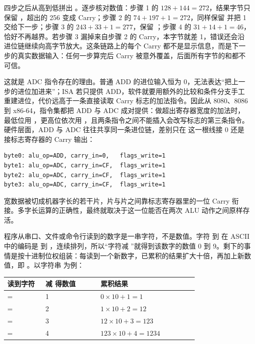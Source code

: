 四步之后从高到低拼出 。逐步核对数值：步骤 1 的 $128+144=272$，结果字节只保留 ，超出的 256 变成 Carry；步骤 2 的 $74+197+1=272$，同样保留  并把 1 交给下一步；步骤 3 的 $243+33+1=277$，保留 ；步骤 4 的 $31+14+1=46$，恰好不再越界。若步骤 3 漏掉来自步骤 2 的 Carry，本字节就差 1，错误还会沿进位链继续向高字节放大。这条链路上的每个 Carry 都不是显示信息，而是下一步的真实数据输入：任何一步算完后 Carry 被意外覆盖，后面所有字节的和都不可信。

这就是 ADC 指令存在的理由。普通 ADD 的进位输入恒为 0，无法表达“把上一步的进位加进来”；ISA 若只提供 ADD，软件就要用额外的比较和条件分支手工重建进位，代价远高于一条直接读取 Carry 标志的加法指令。因此从 8080、8086 到 x86-64，指令集都把 ADD 与 ADC 成对提供：做超出寄存器宽度的加法时，最低位用 ，更高位依次用 ，且两条指令之间不能插入会改写标志的第三条指令。硬件层面，ADD 与 ADC 往往共享同一条进位链，差别只在  这一根线接 0 还是接标志寄存器的 Carry 输出：

\begin{lstlisting}
byte0: alu_op=ADD, carry_in=0,   flags_write=1
byte1: alu_op=ADC, carry_in=CF,  flags_write=1
byte2: alu_op=ADC, carry_in=CF,  flags_write=1
byte3: alu_op=ADC, carry_in=CF,  flags_write=1
\end{lstlisting}

宽数据被切成机器字长的若干片，片与片之间靠标志寄存器里的一位 Carry 衔接。多字长运算的正确性，最终就取决于这一位能否在两次 ALU 动作之间原样存活。

程序从串口、文件或命令行读到的数字是一串字符，不是数值。字符  到  在 ASCII 中的编码是  到 ，连续排列，所以“字符减 ”就得到该数字的数值 0 到 9。剩下的事情是按十进制位权组装：每读到一个新数字，已累积的结果扩大十倍，再加上新数值，即 。以字符串  为例：

\begin{longtable}{L{0.18\linewidth}L{0.26\linewidth}L{0.46\linewidth}}
\toprule
读到字符 & 减  得数值 & 累积结果  \\
\midrule
{} =  & 1 & $0\times10+1=1$ \\\tablerowrule
{} =  & 2 & $1\times10+2=12$ \\\tablerowrule
{} =  & 3 & $12\times10+3=123$ \\\tablerowrule
{} =  & 4 & $123\times10+4=1234$ \\
\bottomrule
\end{longtable}

